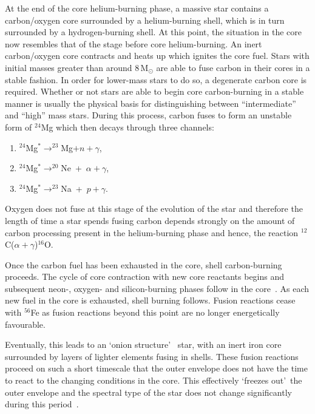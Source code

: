 At the end of the core helium-burning phase, a massive star contains a carbon/oxygen core surrounded by a helium-burning shell, which is in turn surrounded by a hydrogen-burning shell.
At this point, the situation in the core now resembles that of the stage before core helium-burning.
An inert carbon/oxygen core contracts and heats up which ignites the core fuel.
Stars with initial masses greater than around 8\,M$_{\odot}$ are able to fuse carbon in their cores in a stable fashion.
In order for lower-mass stars to do so, a degenerate carbon core is required.
Whether or not stars are able to begin core carbon-burning in a stable manner is usually the physical basis for distinguishing between ``intermediate'' and ``high'' mass stars.
During this process, carbon fuses to form an unstable form of $^{24}$Mg which then decays through three channels:

\begin{enumerate}
    \item $^{24}$Mg$^{*}\rightarrow ^{23}$Mg$+n+\gamma$,
    \item $^{24}$Mg$^{*}\rightarrow ^{20}$Ne~+~$\alpha+\gamma$,
    \item $^{24}$Mg$^{*}\rightarrow ^{23}$Na~+~$p+\gamma$.
\end{enumerate}

Oxygen does not fuse at this stage of the evolution of the star and therefore the length of time a star spends fusing carbon depends strongly on the amount of carbon processing present in the helium-burning phase and hence, the reaction $^{12}$C($\alpha+\gamma$)$^{16}$O.

Once the carbon fuel has been exhausted in the core, shell carbon-burning proceeds.
The cycle of core contraction with new core reactants begins and subsequent neon-, oxygen- and silicon-burning phases follow in the core~\citep{Woosley02}.
As each new fuel in the core is exhausted, shell burning follows.
Fusion reactions cease with $^{56}$Fe as fusion reactions beyond this point are no longer energetically favourable.

Eventually, this leads to an \textquoteleft onion structure\textquoteright
~star, with an inert iron core surrounded by layers of lighter elements fusing in shells.
These fusion reactions proceed on such a short timescale that the outer envelope does not have the time to react to the changing conditions in the core.
This effectively \textquoteleft freezes out\textquoteright ~the outer envelope and the spectral type of the star does not change significantly during this period~\citep{Meynet11}.


